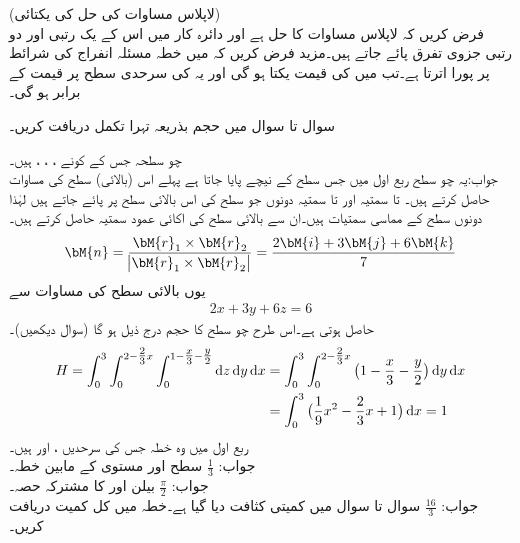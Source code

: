 \quad (لاپلاس مساوات کی حل کی یکتائی)\\
فرض کریں کہ  لاپلاس مساوات کا حل ہے اور دائرہ کار  میں اس کے یک رتبی اور دو رتبی جزوی تفرق پائے جاتے ہیں۔مزید فرض کریں کہ  میں خطہ   مسئلہ انفراج کی شرائط پر پورا اترتا ہے۔تب  میں  کی قیمت یکتا ہو گی اور یہ  کی سرحدی سطح  پر قیمت کے برابر ہو گی۔

سوال  تا سوال  میں حجم بذریعہ تہرا تکمل دریافت کریں۔

\quad چو سطحہ جس کے کونے ، ، ،  ہیں۔\\
جواب:\quad یہ چو سطح ربع اول میں جس سطح  کے نیچے پایا جاتا ہے پہلے اس (بالائی) سطح کی مساوات حاصل کرتے ہیں۔  تا  سمتیہ  اور  تا  سمتیہ  دونوں جو سطح کی اس بالائی سطح پر پائے جاتے ہیں لہٰذا دونوں سطح کے مماسی سمتیات ہیں۔ان سے بالائی سطح کی اکائی عمود سمتیہ  حاصل کرتے ہیں۔
\begin{align*}
\bM{n}=\frac{\bM{r}_1\times \bM{r}_2}{\abs{\bM{r}_1\times \bM{r}_2}}=\frac{2\bM{i}+3\bM{j}+6\bM{k}}{7}
\end{align*}
یوں بالائی سطح کی مساوات  سے
\begin{align*}
2x+3y+6z=6
\end{align*}
حاصل ہوتی ہے۔اس طرح چو سطح کا حجم درج ذیل ہو گا (سوال  دیکھیں)۔
\begin{align*}
H=\int_0^3\int_0^{2-\tfrac{2}{3}x}\int_0^{1-\tfrac{x}{3}-\tfrac{y}{2}} \dif z\dif y\dif x&=\int_0^3\int_0^{2-\tfrac{2}{3}x}\big(1-\frac{x}{3}-\frac{y}{2}\big)\dif y\dif x\\
&=\int_0^3 \big(\frac{1}{9}x^2-\frac{2}{3}x+1\big)\dif x=1
\end{align*}
\quad ربع اول میں وہ خطہ جس کی سرحدیں ،  اور  ہیں۔\\
جواب:\quad 
$\tfrac{1}{3}$
\quad سطح  اور  مستوی  کے مابین خطہ۔\\
جواب:\quad 
$\tfrac{\pi}{2}$
\quad بیلن  اور  کا مشترکہ حصہ۔\\
جواب:\quad 
$\tfrac{16}{3}$
سوال  تا سوال  میں کمیتی کثافت  دیا گیا ہے۔خطہ  میں کل کمیت دریافت کریں۔


